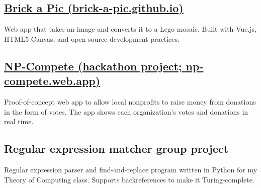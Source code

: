 \documentclass[letterpaper,10pt]{article}
\begin{document}
\begin{minipage}[t]{\dimexpr.67\textwidth-.5\columnsep}
\subsection[Brick a Pic]{\href{https://brick-a-pic.github.io/brick-a-pic}{Brick a Pic (brick-a-pic.github.io)}}
Web app that takes an image and converts it to a Lego mosaic. Built with Vue.js, HTML5 Canvas, and open-source development practices.

\subsection[NP-Compete]{\href{https://np-compete.web.app}{NP-Compete (hackathon project; np-compete.web.app)}}
Proof-of-concept web app to allow local nonprofits to raise money from donations in the form of votes. The app shows each organization's votes and donations in real time.

\subsection{Regular expression matcher group project}
Regular expression parser and find-and-replace program written in Python for my Theory of Computing class. Supports backreferences to make it Turing-complete.





\end{minipage}
\end{document}
